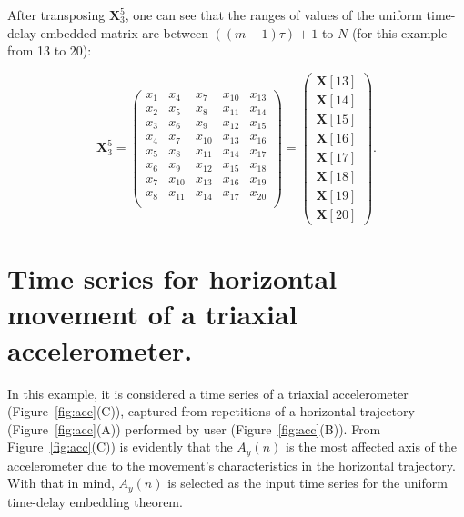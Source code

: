 After transposing $\boldsymbol{X}^{5}_{3}$, one can see that the ranges of
values of the uniform time-delay embedded matrix are between
$ ( (m-1)\tau )+1$  to $N$  (for this example from 13 to 20):

\begin{equation}\label{eq:etdee2}
\boldsymbol{X}^5_3 =
\begin{pmatrix}
x_1 & x_4 & x_{7} & x_{10} & x_{13} \\
x_2 & x_5 & x_{8} & x_{11} & x_{14} \\
x_3 & x_6 & x_{9} & x_{12} & x_{15} \\
x_4 & x_7 & x_{10} & x_{13} & x_{16} \\
x_5 & x_8 & x_{11} & x_{14} & x_{17} \\
x_6 & x_9 & x_{12} & x_{15} & x_{18} \\
x_7 & x_{10} & x_{13} & x_{16} & x_{19} \\
x_8 & x_{11} & x_{14} & x_{17} & x_{20} \\
\end{pmatrix} =
\begin{pmatrix}
   \boldsymbol{X}[13] \\
   \boldsymbol{X}[14] \\
   \boldsymbol{X}[15] \\
   \boldsymbol{X}[16] \\
   \boldsymbol{X}[17] \\
   \boldsymbol{X}[18] \\
   \boldsymbol{X}[19] \\
   \boldsymbol{X}[20]
\end{pmatrix}.
\end{equation}


\section{Time series for horizontal movement of a triaxial accelerometer.}
In this example, it is considered a time series of a triaxial accelerometer 
(Figure~\ref{fig:acc}(C)),
captured from repetitions of a horizontal trajectory (Figure~\ref{fig:acc}(A))
performed by user (Figure~\ref{fig:acc}(B)).
From Figure~\ref{fig:acc}(C)) is evidently that the $A_y(n)$ is 
the most affected axis of the accelerometer due to the movement's 
characteristics in the horizontal trajectory.
With that in mind, $A_y(n)$ is selected as the input time series
for the uniform time-delay embedding theorem.


